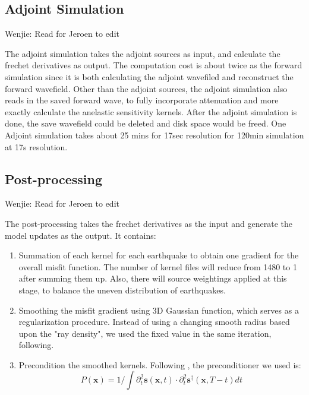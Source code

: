 \documentclass[extra,mreferee]{gji}
\begin{document}
\subsection{Adjoint Simulation}

{\color{Red} Wenjie: Read for Jeroen to edit}

The adjoint simulation takes the adjoint sources as input, and calculate the frechet
derivatives as output. The computation cost is about twice as the forward simulation since
it is both calculating the adjoint wavefiled and reconstruct the forward wavefield.
Other than the adjoint sources, the adjoint simulation also reads in the saved forward
wave, to fully incorporate attenuation and more exactly calculate the anelastic
sensitivity kernels.
After the adjoint simulation is done, the save wavefield could be deleted and disk
space would be freed.
One Adjoint simulation takes about 25 mins for 17sec resolution for 120min simulation
at 17s resolution.

\subsection{Post-processing}

{\color{Red} Wenjie: Read for Jeroen to edit}

The post-processing takes the frechet derivatives as the input and generate
the model updates as the output. It contains:
\begin{enumerate}
  \item Summation of each kernel for each earthquake to obtain one
    gradient for the overall misfit function. The number of kernel
    files will reduce from 1480 to 1 after summing them up. Also,
    there will source weightings applied at this stage, to balance
    the uneven distribution of earthquakes.
  \item Smoothing the misfit gradient using 3D Gaussian function, which
    serves as a regularization procedure. Instead of using a changing
    smooth radius based upon the "ray density"\citep{bozdaug2016global},
    we used the fixed value in the same iteration, following\cite{zhu2012structure}.
  \item Precondition the smoothed kernels. Following
    \citep{luo2013strategies, zhu2012structure, bozdaug2016global},
    the preconditioner we used is:
    \begin{equation}
      P(\mathbf{x}) = 1 / \int \partial_t^2 \mathbf{s}(\mathbf{x}, t) \cdot \partial_t^2 \mathbf{s}^\dagger(\mathbf{x}, T-t) dt
    \end{equation}
\end{enumerate}
\end{document}
